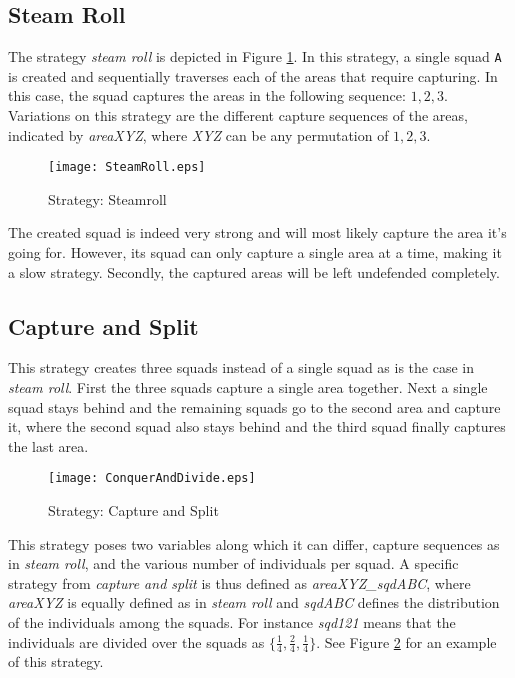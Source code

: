 \subsection{Steam Roll}
The strategy \emph{steam roll} is depicted in Figure \ref{fig:steamroll}. In
this strategy, a single squad \verb|A| is created and sequentially traverses
each of the areas that require capturing. In this case, the squad captures the
areas in the following sequence: $1,2,3$. Variations on this strategy are the
different capture sequences of the areas, indicated by \emph{areaXYZ}, where
\emph{XYZ} can be any permutation of $1,2,3$.
\begin{figure}[!ht]
\centering
\texttt{[image: SteamRoll.eps]}
\caption{Strategy: Steamroll}
\label{fig:steamroll}
\end{figure}
The created squad is indeed very strong and will most likely capture the area
it's going for. However, its squad can only capture a single area at a time,
making it a slow strategy. Secondly, the captured areas will be left undefended
completely.

\subsection{Capture and Split}
This strategy creates three squads instead of a single squad as is the case in
\emph{steam roll}. First the three squads capture a single area together. Next
a single squad stays behind and the remaining squads go to the second area and
capture it, where the second squad also stays behind and the third squad
finally captures the last area. 
\begin{figure}[!ht]
\centering
\texttt{[image: ConquerAndDivide.eps]}
\caption{Strategy: Capture and Split}
\label{fig:candd}
\end{figure}
This strategy poses two variables along which it can differ, capture sequences
as in \emph{steam roll}, and the various number of individuals per squad. A
specific strategy from \emph{capture and split} is thus defined as
\emph{areaXYZ\_sqdABC}, where \emph{areaXYZ} is equally defined as in
\emph{steam roll} and \emph{sqdABC} defines the distribution of the individuals
among the squads. For instance \emph{sqd121} means that the individuals are
divided over the squads as $\{\frac{1}{4}, \frac{2}{4}, \frac{1}{4}\}$. See
Figure \ref{fig:candd} for an example of this strategy.

